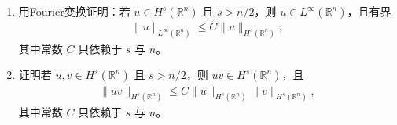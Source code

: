 \documentclass[../../main.tex]{subfiles}
\begin{document}
\begin{enumerate}
\item 用Fourier变换证明：若 $u\in H^{s}(\mathbb{R}^{n})$ 且 $s>n/2$，则 $u\in L^{\infty}(\mathbb{R}^{n})$，且有界
\begin{align*}
\|u\|_{L^{\infty}(\mathbb{R}^{n})}\leqslant C\|u\|_{H^{s}(\mathbb{R}^{n})},
\end{align*}
其中常数 $C$ 只依赖于 $s$ 与 $n$。

\item 证明若 $u,v\in H^{s}(\mathbb{R}^{n})$ 且 $s>n/2$，则 $uv\in H^{s}(\mathbb{R}^{n})$，且
\begin{align*}
\|uv\|_{H^{s}(\mathbb{R}^{n})}\leqslant C\|u\|_{H^{s}(\mathbb{R}^{n})}\|v\|_{H^{s}(\mathbb{R}^{n})},
\end{align*}
其中常数 $C$ 只依赖于 $s$ 与 $n$。
\end{enumerate}
\end{document}
